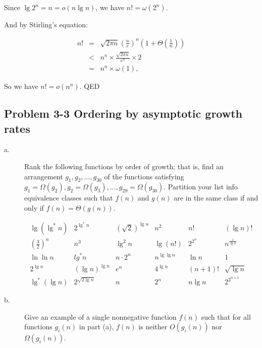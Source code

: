 \documentclass{article}
\newcommand{\problem}[1]{\subsection*{Problem #1}}
\newcommand{\qed}{ QED}
\begin{document}
Since $\lg 2^n = n = o(n\lg n)$, we have $n ! = \omega(2^n)$.

And by Stirling's equation:

\begin{eqnarray*}
n! &=& \sqrt{2\pi n}\left(\frac{n}{e}\right)^n\left(1 + \Theta\left(\frac{1}{n}\right)\right)\\
&<& n^n \times \frac{\sqrt{2\pi n}}{e^n} \times 2\\
&=& n^n \times \omega(1),
\end{eqnarray*}

So we have $n! = o(n^n)$.
\qed

\problem{3-3 Ordering by asymptotic growth rates}

\begin{description}
\item[a. \hspace{9pt}] Rank the following functions by order of growth; that is, find an arrangement $g_1, g_2, ..., g_{30}$ of the functions satisfying
$g_1 = \Omega(g_2), g_2 = \Omega(g_3), ..., g_{29} = \Omega(g_{30})$. Partition your list info equivalence classes such that $f(n)$ and $g(n)$
are in the same class if and only if $f(n) = \Theta(g(n))$.

\begin{equation*}
\begin{array}{cccccc}
\lg(\lg^*n)                 & 2^{\lg^*n}          & \left(\sqrt 2\right)^{\lg n}  & n^2           & n!        & (\lg n)!\\
\left(\frac{3}{2}\right)^n  & n^3                 & \lg^2n                        & \lg(n!)       & 2^{2^n}   & n^{\frac{1}{\lg n}}\\
\ln\ln n                    & lg^*n               & n \cdot 2^n                   & n^{\lg\lg n}  & \ln n     & 1\\
2^{\lg n}                   & (\lg n)^{\lg n}     & e^n                           & 4^{\lg n}     & (n+1)!    &  \sqrt{\lg n}\\
\lg^*(\lg n)                & 2^{\sqrt{2 \lg n}}  & n                             & 2^n           & n\lg n    & 2^{2^{n+1}}
\end{array}
\end{equation*}

\item[b. \hspace{9pt}] Give an example of a single nonnegative function $f(n)$ such that for all functions $g_i(n)$ in part (a), $f(n)$ is neither $O(g_i(n))$
nor $\Omega(g_i(n))$.
\end{description}
\end{document}
